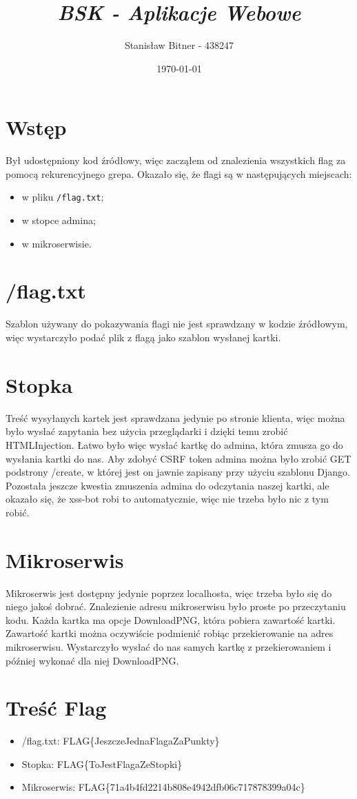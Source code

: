 \documentclass[12pt, a4paper]{article}
\title{\textit{
    \textbf{BSK - Aplikacje Webowe}\\
}}
\author{Stanisław Bitner - 438247}
\date{\today}
\begin{document}
\maketitle

\section*{Wstęp}
Był udostępniony kod źródłowy, więc zacząłem od znalezienia wszystkich flag za
pomocą rekurencyjnego grepa.
Okazało się, że flagi są w następujących miejscach:
\begin{itemize}
  \item w pliku \texttt{/flag.txt};
  \item w stopce admina;
  \item w mikroserwisie.
\end{itemize}

\section*{/flag.txt}
Szablon używany do pokazywania flagi nie jest sprawdzany w kodzie źródłowym,
więc wystarczyło podać plik z flagą jako szablon wysłanej kartki.

\section*{Stopka}
Treść wysyłanych kartek jest sprawdzana jedynie po stronie klienta, więc można
było wysłać zapytania bez użycia przeglądarki i dzięki temu zrobić
HTMLInjection. Łatwo było więc wysłać kartkę do admina, która zmusza go do
wysłania kartki do nas. Aby zdobyć CSRF token admina można było zrobić GET
podstrony /create, w której jest on jawnie zapisany przy użyciu szablonu
Django. Pozostała jeszcze kwestia zmuszenia admina do odczytania naszej kartki,
ale okazało się, że xss-bot robi to automatycznie, więc nie trzeba było nic
z tym robić.

\section*{Mikroserwis}
Mikroserwis jest dostępny jedynie poprzez localhosta, więc trzeba było się do
niego jakoś dobrać. Znalezienie adresu mikroserwisu było proste po przeczytaniu
kodu. Każda kartka ma opcje DownloadPNG, która pobiera zawartość kartki.
Zawartość kartki można oczywiście podmienić robiąc przekierowanie na adres
mikroserwisu. Wystarczyło wysłać do nas samych kartkę z przekierowaniem
i później wykonać dla niej DownloadPNG.

\section*{Treść Flag}
\begin{itemize}
  \item /flag.txt:   FLAG\{JeszczeJednaFlagaZaPunkty\}
  \item Stopka:      FLAG\{ToJestFlagaZeStopki\}
  \item Mikroserwis: FLAG\{71a4b4fd2214b808e4942dfb06c717878399a04c\}
\end{itemize}
\end{document}

